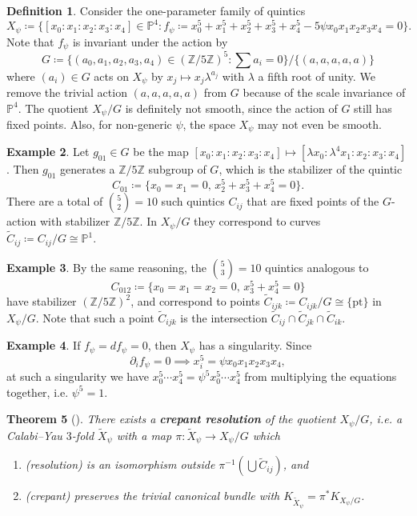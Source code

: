 \documentclass{report}
\theoremstyle{plain}
\newtheorem{theorem}{Theorem}[section]
\theoremstyle{definition}
\newtheorem{definition}[theorem]{Definition}
\newtheorem{example}[theorem]{Example}
\theoremstyle{remark}
\newcommand{\di}{\partial}
\newcommand{\bP}{\mathbb{P}}
\newcommand{\bZ}{\mathbb{Z}}
\newcommand{\pt}{\mathrm{pt}}
\begin{document}
\begin{definition}
  Consider the one-parameter family of quintics
  \[ X_\psi \coloneqq \{[x_0 : x_1 : x_2 : x_3 : x_4] \in \bP^4 : f_\psi \coloneqq x_0^5 + x_1^5 + x_2^5 + x_3^5 + x_4^5 - 5\psi x_0x_1x_2x_3x_4 = 0\}. \]
  Note that $f_\psi$ is invariant under the action by
  \[ G \coloneqq \{(a_0, a_1, a_2, a_3, a_4) \in (\bZ/5\bZ)^5 : \sum a_i = 0\}/\{(a,a,a,a,a)\} \]
  where $(a_i) \in G$ acts on $X_\psi$ by $x_j \mapsto x_j
  \lambda^{a_j}$ with $\lambda$ a fifth root of unity. We remove the
  trivial action $(a,a,a,a,a)$ from $G$ because of the scale
  invariance of $\bP^4$. The quotient $X_\psi/G$ is definitely not
  smooth, since the action of $G$ still has fixed points. Also, for
  non-generic $\psi$, the space $X_\psi$ may not even be smooth.
\end{definition}

\begin{example}
  Let $g_{01} \in G$ be the map $[x_0 : x_1 : x_2 : x_3 : x_4] \mapsto
  [\lambda x_0 : \lambda^4 x_1 : x_2 : x_3 : x_4]$. Then $g_{01}$
  generates a $\bZ/5\bZ$ subgroup of $G$, which is the stabilizer of
  the quintic
  \[ C_{01} \coloneqq \{x_0 = x_1 = 0, \, x_2^5 + x_3^5 + x_4^5 = 0\}. \]
  There are a total of $\binom{5}{2} = 10$ such quintics $C_{ij}$ that
  are fixed points of the $G$-action with stabilizer $\bZ/5\bZ$. In
  $X_\psi/G$ they correspond to curves $\tilde{C}_{ij} \coloneqq
  C_{ij}/G \cong \bP^1$.
\end{example}

\begin{example}
  By the same reasoning, the $\binom{5}{3} = 10$ quintics analogous to
  \[ C_{012} \coloneqq \{x_0 = x_1 = x_2 = 0, \, x_3^5 + x_4^5 = 0\} \]
  have stabilizer $(\bZ/5\bZ)^2$, and correspond to points
  $\tilde{C}_{ijk} \coloneqq C_{ijk}/G \cong \{\pt\}$ in $X_\psi/G$.
  Note that such a point $\tilde{C}_{ijk}$ is the intersection
  $\tilde{C}_{ij} \cap \tilde{C}_{jk} \cap \tilde{C}_{ik}$.
\end{example}

\begin{example}
  If $f_\psi = df_\psi = 0$, then $X_\psi$ has a singularity. Since
  \[ \di_i f_\psi = 0 \implies x_i^5 = \psi x_0 x_1 x_2 x_3 x_4, \]
  at such a singularity we have $x_0^5\cdots x_4^5 = \psi^5 x_0^5
  \cdots x_4^5$ from multiplying the equations together, i.e. $\psi^5
  = 1$.
\end{example}

\begin{theorem}[{\cite[Appendix: Proposition 4]{Markushevich1987}}]
  There exists a {\bf crepant resolution} of the quotient $X_\psi/G$,
  i.e. a Calabi--Yau $3$-fold $\tilde{X}_\psi$ with a map
  $\pi\colon\tilde{X}_\psi \to X_\psi/G$ which
  \begin{enumerate}
  \item (resolution) is an isomorphism outside $\pi^{-1}(\bigcup
    \tilde{C}_{ij})$, and
  \item (crepant) preserves the trivial canonical bundle with
    $K_{\tilde{X}_\psi} = \pi^*K_{X_\psi/G}$.
  \end{enumerate}
\end{theorem}
\end{document}
